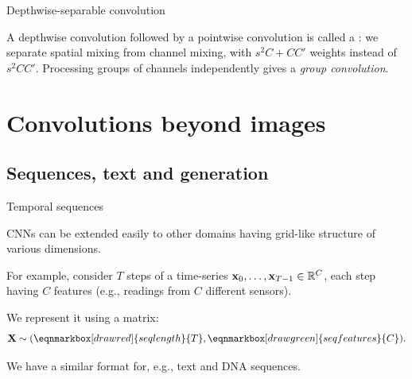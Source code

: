 \documentclass[11pt,aspectratio=169]{beamer}
\begin{document}
\begin{whiteframe}{Depthwise-separable convolution}

    {\centering
        \par}

    A depthwise convolution followed by a pointwise convolution is called a
    : we separate spatial mixing
    from channel mixing, with $s^2C+CC'$ weights instead of $s^2CC'$.
    Processing groups of channels independently gives a \textit{group convolution}.

\end{whiteframe}


\section{Convolutions beyond images}
\subsection{Sequences, text and generation}

\begin{frame}{Temporal sequences}
    \setlength{\parskip}{3pt}

    CNNs can be extended easily to other domains having grid-like structure
    of various dimensions.

    For example, consider $T$ steps of a time-series
    $\boldsymbol{\mathbf{x}}_0,\ldots,\boldsymbol{\mathbf{x}}_{T-1}\in\mathbb{R}^C$, each step having $C$
    features (e.g., readings from $C$ different sensors).

    We represent it using a matrix:
    \vspace{1.5em}
    \[
        \vc{X}\sim(\eqnmarkbox[drawred]{seqlength}{T},
        \eqnmarkbox[drawgreen]{seqfeatures}{C}).
    \]

    We have a similar format for, e.g., text and DNA sequences.

\end{frame}
\end{document}
